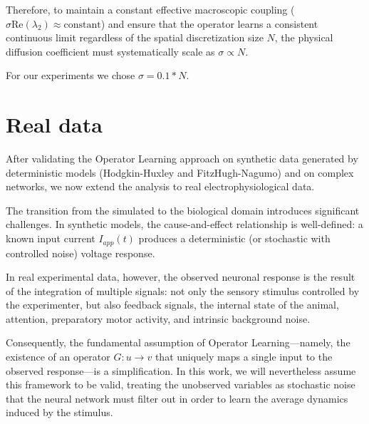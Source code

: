 Therefore, to maintain a constant effective macroscopic coupling ($\sigma \text{Re}(\lambda_2) \approx \text{constant}$) and ensure that the operator learns a consistent continuous limit regardless of the spatial discretization size $N$, the physical diffusion coefficient must systematically scale as $\sigma \propto N$.


For our experiments we chose $\sigma=0.1*N$.


\newpage
\section{Real data}

After validating the Operator Learning approach on synthetic data generated by deterministic models (Hodgkin-Huxley and FitzHugh-Nagumo) and on complex networks, we now extend the analysis to real electrophysiological data.

The transition from the simulated to the biological domain introduces significant challenges. In synthetic models, the cause-and-effect relationship is well-defined: a known input current $I_{app}(t)$ produces a deterministic (or stochastic with controlled noise) voltage response. 

In real experimental data, however, the observed neuronal response is the result of the integration of multiple signals: not only the sensory stimulus controlled by the experimenter, but also feedback signals, the internal state of the animal, attention, preparatory motor activity, and intrinsic background noise. 

Consequently, the fundamental assumption of Operator Learning---namely, the existence of an operator $G: u \to v$ that uniquely maps a single input to the observed response---is a simplification. In this work, we will nevertheless assume this framework to be valid, treating the unobserved variables as stochastic noise that the neural network must filter out in order to learn the average dynamics induced by the stimulus.

